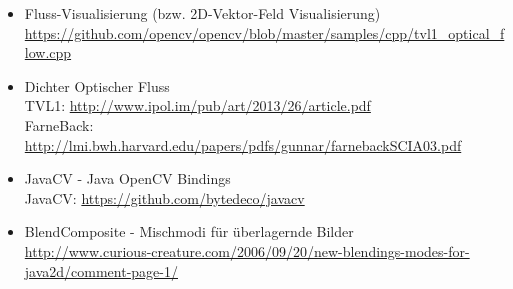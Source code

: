 \begin{itemize}
\item Fluss-Visualisierung (bzw. 2D-Vektor-Feld Visualisierung)\\
		\url{https://github.com/opencv/opencv/blob/master/samples/cpp/tvl1_optical_flow.cpp}
\item Dichter Optischer Fluss\\
TVL1: \url{http://www.ipol.im/pub/art/2013/26/article.pdf} \\
FarneBack: \url{http://lmi.bwh.harvard.edu/papers/pdfs/gunnar/farnebackSCIA03.pdf} 

\item JavaCV - Java OpenCV Bindings \\
JavaCV: \url{https://github.com/bytedeco/javacv}

\item BlendComposite - Mischmodi für überlagernde Bilder \\
\url{http://www.curious-creature.com/2006/09/20/new-blendings-modes-for-java2d/comment-page-1/}
\end{itemize}






